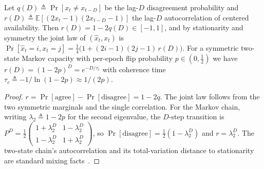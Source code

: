 \begin{lemma}\label{lem:q}
Let $q(D)\triangleq\Pr[x_t\neq x_{t-D}]$ be the lag-$D$ disagreement probability
and $r(D)\triangleq\mathbb{E}[(2x_t\!-\!1)(2x_{t-D}\!-\!1)]$ the lag-$D$
autocorrelation of centered availability. Then $r(D)=1-2q(D)\in[-1,1]$, and by
stationarity and symmetry the joint law of $(\hat x_t,x_t)$ is
$\Pr[\hat x_t{=}i,x_t{=}j]=\tfrac14\big(1+(2i{-}1)(2j{-}1)\,r(D)\big)$.
For a symmetric two-state Markov capacity with per-epoch flip probability
$p\in(0,\tfrac12)$ we have $r(D)=(1-2p)^{D}=e^{-D/\tau_c}$ with coherence time
$\tau_c\triangleq-1/\ln(1-2p)\approx 1/(2p)$.
\end{lemma}
\begin{proof}
$r=\Pr[\text{agree}]-\Pr[\text{disagree}]=1-2q$. The joint law follows from the
two symmetric marginals and the single correlation. For the Markov chain, writing
$\lambda_2\triangleq1-2p$ for the second eigenvalue, the $D$-step transition is
$P^D=\tfrac12\!\left(\begin{smallmatrix}1+\lambda_2^D&1-\lambda_2^D\\1-\lambda_2^D&1+\lambda_2^D\end{smallmatrix}\right)$,
so $\Pr[\text{disagree}]=\tfrac12(1-\lambda_2^D)$ and $r=\lambda_2^D$. The
two-state chain's autocorrelation and its total-variation distance to
stationarity are standard mixing facts~\cite{lpw}.
\end{proof}

